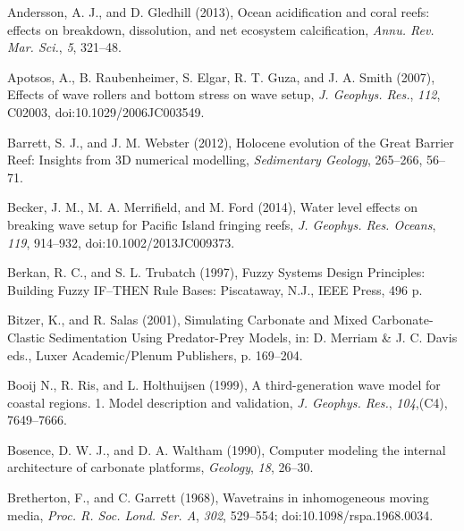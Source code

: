 \documentclass[default,jgrga]{agutex2015}
\begin{document}
\begin{article}
\begin{thebibliography}{}

Andersson, A. J., and D. Gledhill (2013), Ocean acidification and coral reefs: effects on breakdown, dissolution, and net ecosystem calcification, \textit{Annu. Rev. Mar. Sci.}, \textit{5}, 321--48.

Apotsos, A., B. Raubenheimer, S. Elgar, R. T. Guza, and J. A. Smith (2007), Effects of wave rollers and bottom stress on wave setup, \textit{J. Geophys. Res.}, \textit{112}, C02003, doi:10.1029/2006JC003549.

Barrett, S. J., and J. M. Webster (2012), Holocene evolution of the Great Barrier Reef: Insights from 3D numerical modelling, \textit{Sedimentary Geology}, 265--266, 56--71.

Becker, J. M., M. A. Merrifield, and M. Ford (2014), Water level effects on breaking wave setup for Pacific Island fringing reefs, \textit{J. Geophys. Res. Oceans}, \textit{119}, 914--932, doi:10.1002/2013JC009373.

Berkan, R. C., and S. L. Trubatch (1997), Fuzzy Systems Design Principles: Building Fuzzy IF–THEN Rule Bases: Piscataway, N.J., IEEE Press, 496 p.

Bitzer, K., and R. Salas (2001), Simulating Carbonate and Mixed Carbonate-Clastic Sedimentation Using Predator-Prey Models, in: D. Merriam \& J. C. Davis eds., Luxer Academic/Plenum Publishers, p. 169--204.

Booij N., R. Ris, and L. Holthuijsen (1999), A third-generation wave model for coastal regions. 1. Model description and validation, \textit{J. Geophys. Res.}, \textit{104},(C4), 7649--7666.

Bosence, D. W. J., and D. A. Waltham (1990), Computer modeling the internal architecture of carbonate platforms, \textit{Geology}, \textit{18}, 26--30.

Bretherton, F., and C. Garrett (1968), Wavetrains in inhomogeneous moving media, \textit{Proc. R. Soc. Lond. Ser. A}, \textit{302}, 529--554; doi:10.1098/rspa.1968.0034.


\end{thebibliography}
\end{article}
\end{document}
